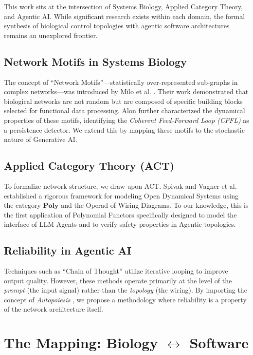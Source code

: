 \documentclass[11pt, a4paper]{article}
\newcommand{\Poly}{\mathbf{Poly}}
\begin{document}
This work sits at the intersection of Systems Biology, Applied Category Theory, and Agentic AI. While significant research exists within each domain, the formal synthesis of biological control topologies with agentic software architectures remains an unexplored frontier.

\subsection{Network Motifs in Systems Biology}
The concept of ``Network Motifs''---statistically over-represented sub-graphs in complex networks---was introduced by Milo et al. \cite{milo2002network}. Their work demonstrated that biological networks are not random but are composed of specific building blocks selected for functional data processing. Alon \cite{alon2007network} further characterized the dynamical properties of these motifs, identifying the \textit{Coherent Feed-Forward Loop (CFFL)} as a persistence detector. We extend this by mapping these motifs to the stochastic nature of Generative AI.

\subsection{Applied Category Theory (ACT)}
To formalize network structure, we draw upon ACT. Spivak \cite{spivak2021learners} and Vagner et al. \cite{vagner2015algebras} established a rigorous framework for modeling Open Dynamical Systems using the category $\Poly$ and the Operad of Wiring Diagrams. To our knowledge, this is the first application of Polynomial Functors specifically designed to model the interface of LLM Agents and to verify safety properties in Agentic topologies.

\subsection{Reliability in Agentic AI}
Techniques such as ``Chain of Thought'' \cite{wei2022chain} utilize iterative looping to improve output quality. However, these methods operate primarily at the level of the \textit{prompt} (the input signal) rather than the \textit{topology} (the wiring). By importing the concept of \textit{Autopoiesis} \cite{maturana1980autopoiesis}, we propose a methodology where reliability is a property of the network architecture itself.

\section{The Mapping: Biology $\leftrightarrow$ Software}
\end{document}
